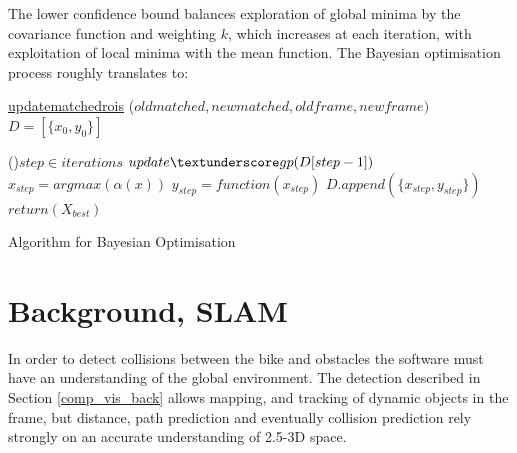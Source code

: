 \documentclass[11pt,twoside]{report}
\begin{document}
The lower confidence bound balances exploration of global minima by the covariance function and weighting $k$, which increases at each iteration, with exploitation of local minima with the mean function. The Bayesian optimisation process roughly translates to:\newline\newline
\begin{algorithm}[H]
	\DontPrintSemicolon
	\SetAlgoLined
	\underline{update\textunderscore matched\textunderscore rois} ($old$\textunderscore$matched,new$\textunderscore$matched,old$\textunderscore$frame,new$\textunderscore$frame)$\;
	\texttt{\\}
	$D = [\{ x_{0},y_{0} \}]$ 
	
	\ForEach(){$step \in iterations$}{
		$update \textunderscore gp(D[step-1])$ 
		$x_{step} = argmax(\alpha(x))$ 
		$y_{step} = function(x_{step})$ 
		$D.append( \{ x_{step},y_{step} \} )$ 
	}
	$return (X_{best})$ 
	\texttt{\\}
	\caption{Algorithm for Bayesian Optimisation}
	\label{alg:weights}
\end{algorithm}

\newpage

\section{Background, SLAM} \label{back_slam}
In order to detect collisions between the bike and obstacles the software must have an understanding of the global environment. The detection described in Section \ref{comp_vis_back} allows mapping, and tracking of dynamic objects in the frame, but distance, path prediction and eventually collision prediction rely strongly on an accurate understanding of 2.5-3D space.
\end{document}
